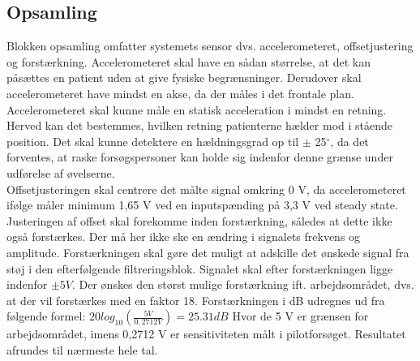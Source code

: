 \subsection{Opsamling}
Blokken opsamling omfatter systemets sensor dvs. accelerometeret, offsetjustering og forstærkning. Accelerometeret skal have en sådan størrelse, at det kan påsættes en patient uden at give fysiske begrænsninger. Derudover skal accelerometeret have mindst en akse, da der måles i det frontale plan. %
Accelerometeret skal kunne måle en statisk acceleration i mindst en retning. Herved kan det bestemmes, hvilken retning patienterne hælder mod i stående position.  %
Det skal kunne detektere en hældningsgrad op til $\pm$ 25$^{\circ}$, da det forventes, at raske forsøgspersoner kan holde sig indenfor denne grænse under udførelse af øvelserne. \\
Offsetjusteringen skal centrere det målte signal omkring 0 V, da accelerometeret ifølge  måler minimum 1,65 V ved en inputspænding på 3,3 V ved steady state. Justeringen af offset skal forekomme inden forstærkning, således at dette ikke også forstærkes. Der må her ikke ske en ændring i signalets frekvens og amplitude. 
Forstærkningen skal gøre det muligt at adskille det ønskede signal fra støj i den efterfølgende filtreringsblok. Signalet skal efter forstærkningen ligge indenfor $\pm 5 V$. Der ønskes den størst mulige forstærkning ift. arbejdsområdet, dvs. at der vil forstærkes med en faktor 18. Forstærkningen i dB udregnes ud fra følgende formel: 
$20log_{10}(\frac{5 V}{0,2712 V})=25.31 dB$
Hvor de 5 V er grænsen for arbejdsområdet, imens 0,2712 V er sensitiviteten målt i pilotforsøget. Resultatet afrundes til nærmeste hele tal. 

